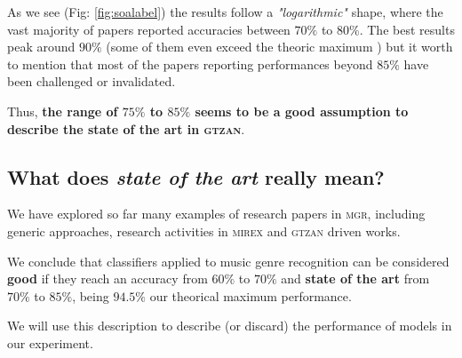 As we see (Fig: \ref{fig:soalabel}) the results follow a {\it "logarithmic"} shape, where the vast majority of papers reported accuracies between $70\%$ to $80\%$. The best results \citep{best7, best61, best16} peak around $90\%$ (some of them even exceed the theoric maximum \citet{discard56}) but it worth to mention that most of the papers reporting performances beyond $85\%$ have been challenged or invalidated. \citep{accuracy}

Thus, {\bf the range of $75\%$ to $85\%$ seems to be a good assumption to describe the state of the art in \textsc{gtzan}}.

\subsection{What does {\it state of the art} really mean?}

We have explored so far many examples of research papers in \textsc{\textsc{mgr}}, including generic approaches, research activities in \textsc{mirex} and \textsc{gtzan} driven works.

We conclude that classifiers applied to music genre recognition can be considered {\bf good} if they reach an accuracy from $60\%$ to $70\%$ and {\bf state of the art} from $70\%$ to $85\%$, being $94.5\%$ our theorical maximum performance.

We will use this description to describe (or discard) the performance of models in our experiment.

